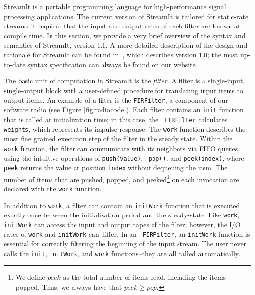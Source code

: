 StreamIt is a portable programming language for high-performance
signal processing applications.  The current version of StreamIt is
tailored for static-rate streams: it requires that the input and
output rates of each filter are known at compile time.  In this
section, we provide a very brief overview of the syntax and semantics
of StreamIt, version 1.1.  A more detailed description of the design
and rationale for StreamIt can be found in~\cite{streamitcc}, which
describes version 1.0; the most up-to-date syntax specificaiton can
always be found on our website~\cite{streamitweb}.

The basic unit of computation in StreamIt is the {\it filter}.  A
filter is a single-input, single-output block with a user-defined
procedure for translating input items to output items.  An example of
a filter is the {\tt FIRFilter}, a component of our software radio
(see Figure \ref{fig:radiocode}).  Each filter contains an {\tt init}
function that is called at initialization time; in this case, the {\tt
FIRFilter} calculates {\tt weights}, which represents its impulse
response.  The {\tt work} function describes the most fine grained
execution step of the filter in the steady state.  Within the {\tt
work} function, the filter can communicate with its neighbors via FIFO
queues, using the intuitive operations of {\tt push(value)}, {\tt
pop()}, and {\tt peek(index)}, where {\tt peek} returns the value at
position {\tt index} without dequeuing the item.  The number of items
that are pushed, popped, and peeked\footnote{We define $peek$ as the
total number of items read, including the items popped.  Thus, we
always have that $peek \ge pop$.} on each invocation are declared with
the {\tt work} function.

In addition to {\tt work}, a filter can contain an {\tt initWork}
function that is executed exactly once between the initialization
period and the steady-state.  Like {\tt work}, {\tt initWork} can
access the input and output tapes of the filter; however, the I/O
rates of {\tt work} and {\tt initWork} can differ.  In an {\tt
FIRFilter}, an {\tt initWork} function is essential for correctly
filtering the beginning of the input stream.  The user never calls the
{\tt init}, {\tt initWork}, and {\tt work} functions--they are all
called automatically.


